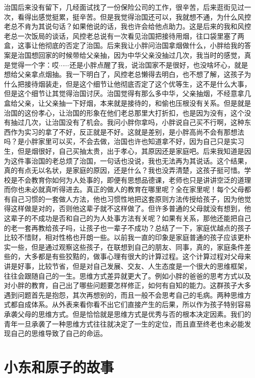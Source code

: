治国后来没有留下，几经面试找了一份保险公司的工作，很辛苦，后来逛街见过一次，看得出感觉挺累，挺辛苦。但是我觉得治国还可以，我就想不通，为什么风控老总不肯为其说句话？如果他说的话，我也许会给他点助力。这是后来的我和风控老总一次饭局的谈话，风控老总说有一次看见治国把接待用烟，往口袋里塞了两盒，这事让他彻底的否定了治国。后来我让小胖问治国拿烟做什么，小胖给我的答案是治国想回家的时候带给父亲抽，因为中华父亲没抽过几次，我当时的感觉，真是觉得一个字：哎$\cdots\cdots$还是小胖点醒了我，说治国家不是很好，也没啥坏心，就是想给父亲拿点烟抽。我一下明白了，风控老总懒得去明白，也不想了解，这孩子为什么把接待烟装走，但是这个细节让他彻底否定了这个优等生，这不是什么大事，但是这个细节让其觉得治国讨厌。治国觉得有那么多中华，父亲抽烟，不经意拿几盒给父亲，让父亲抽一下好烟，本来就是接待的，和偷也压根没有关系。但是就是治国的这份孝心，让治国的形象在他们老总那里大打折扣，也是因为没有，这个没有抽过几次，让治国没有了机会。我问小胖你拿吗，小胖说自己买不行啊，这种东西作为实习的拿了不好，反正就是不好。这就是差别，是小胖高尚不会有那想法吗？是小胖家里可以买，不会去做，治国也许也知道拿不好，因为自己只是实习生，但是烟很好，自己买抽太贵，出于孝心，其原因还是家庭吧。后来我知道是因为这件事治国的老总烦了治国，一句话也没说，我也无法再为其说话。这个结果，真的有点无以名状，是家庭的原因，还是什么？我也没弄清楚，这孩子挺可惜。学校是不会教育你如何为人处事的，即便有思想品德课，老师也只是讲讲空泛的道理而你也未必就真听得进去。真正的做人的教育在哪里呢？全在家里呢！每个父母都有自己习惯的一套做人方法，他也习惯性地把这套原则方法传授给孩子，因为他觉得这样做是对的，否则他这辈子就不这样做了。但许多普通的父母就没有想到，他这辈子的不成功是否和自己的为人处事方法有关呢？如果有关系，那他还能把自己的老一套再教给孩子吗，让孩子也一辈子不成功？总结了一下，家庭优越点的孩子比较不惜财，相对性格也开朗一些。以前我一直的印象是家庭普通的孩子应该更朴实一些，但是通过观察这些孩子，在联想到自己的朋友、同事，真的，家庭条件差些的，大多都是有些狡黠的，做事心理有很大的计算过程。这个计算过程对父母来讲是好事，比较节省，但是对自己发展、交友、人生态度是一个很大的思维框架，往往会跟随自己的一生。思维方式差异就更大了。例如小胖的爸爸的思考方式以及对小胖的教育，自己出了哪些问题要怎样修正，如何有自知的能力。这群孩子大多遇到问题首先是抱怨，其次再想别的，而且一般不会思考自己的毛病。两种思维方式都自成体系。从外表来看你看不出它们直接产生的后果，所以作为孩子特别容易承袭父母的思维方式。但是恰恰就是思维方式是优秀与否的根本决定因素。我们的青年一旦承袭了一种思维方式往往就决定了一生的定位，而且直至终老也未必能发现自己的思维导致了自己的命运。

\section{小东和原子的故事}

